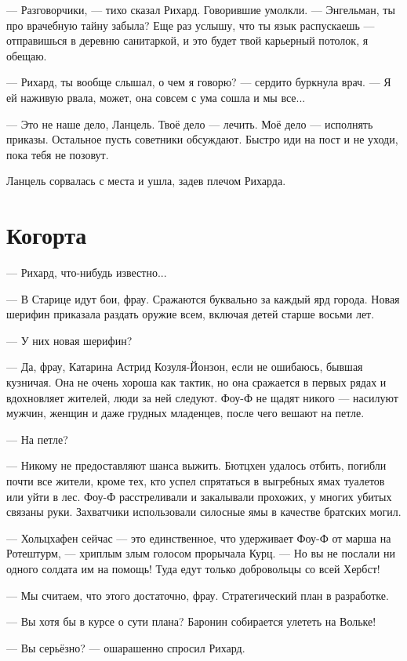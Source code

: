 --- Разговорчики, --- тихо сказал Рихард.
Говорившие умолкли.
--- Энгельман, ты про врачебную тайну забыла?
Еще раз услышу, что ты язык распускаешь --- отправишься в деревню санитаркой, и это будет твой карьерный потолок, я обещаю.

--- Рихард, ты вообще слышал, о чем я говорю? --- сердито буркнула врач.
--- Я ей наживую рвала, может, она совсем с ума сошла и мы все...

--- Это не наше дело, Ланцель.
Твоё дело --- лечить.
Моё дело --- исполнять приказы.
Остальное пусть советники обсуждают.
Быстро иди на пост и не уходи, пока тебя не позовут.

Ланцель сорвалась с места и ушла, задев плечом Рихарда.

\section{Когорта}

--- Рихард, что-нибудь известно...

--- В Старице идут бои, фрау.
Сражаются буквально за каждый ярд города.
Новая шерифин приказала раздать оружие всем, включая детей старше восьми лет.

--- У них новая шерифин?

--- Да, фрау, Катарина Астрид Козуля-Йонзон, если не ошибаюсь, бывшая кузничая.
Она не очень хороша как тактик, но она сражается в первых рядах и вдохновляет жителей, люди за ней следуют.
Фоу-Ф не щадят никого --- насилуют мужчин, женщин и даже грудных младенцев, после чего вешают на петле.

--- На петле?

--- Никому не предоставляют шанса выжить.
Бютцхен удалось отбить, погибли почти все жители, кроме тех, кто успел спрятаться в выгребных ямах туалетов или уйти в лес. %
Фоу-Ф расстреливали и закалывали прохожих, у многих убитых связаны руки.
Захватчики использовали силосные ямы в качестве братских могил.

--- Хольцхафен сейчас --- это единственное, что удерживает Фоу-Ф от марша на Ротештурм, --- хриплым злым голосом прорычала Курц.
--- Но вы не послали ни одного солдата им на помощь!
Туда едут только добровольцы со всей Хербст!

--- Мы считаем, что этого достаточно, фрау.
Стратегический план в разработке.

--- Вы хотя бы в курсе о сути плана?
Баронин собирается улететь на Вольке!

--- Вы серьёзно? --- ошарашенно спросил Рихард.


